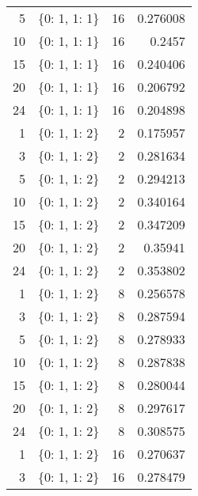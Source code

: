 \documentclass{article}
\begin{document}
\begin{table}[H]
\begin{tabular}{rlrr}
              5 & \{0: 1, 1: 1\}              &          16 &               0.276008  \\
             10 & \{0: 1, 1: 1\}              &          16 &               0.2457    \\
             15 & \{0: 1, 1: 1\}              &          16 &               0.240406  \\
             20 & \{0: 1, 1: 1\}              &          16 &               0.206792  \\
             24 & \{0: 1, 1: 1\}              &          16 &               0.204898  \\
              1 & \{0: 1, 1: 2\}              &           2 &               0.175957  \\
              3 & \{0: 1, 1: 2\}              &           2 &               0.281634  \\
              5 & \{0: 1, 1: 2\}              &           2 &               0.294213  \\
             10 & \{0: 1, 1: 2\}              &           2 &               0.340164  \\
             15 & \{0: 1, 1: 2\}              &           2 &               0.347209  \\
             20 & \{0: 1, 1: 2\}              &           2 &               0.35941   \\
             24 & \{0: 1, 1: 2\}              &           2 &               0.353802  \\
              1 & \{0: 1, 1: 2\}              &           8 &               0.256578  \\
              3 & \{0: 1, 1: 2\}              &           8 &               0.287594  \\
              5 & \{0: 1, 1: 2\}              &           8 &               0.278933  \\
             10 & \{0: 1, 1: 2\}              &           8 &               0.287838  \\
             15 & \{0: 1, 1: 2\}              &           8 &               0.280044  \\
             20 & \{0: 1, 1: 2\}              &           8 &               0.297617  \\
             24 & \{0: 1, 1: 2\}              &           8 &               0.308575  \\
              1 & \{0: 1, 1: 2\}              &          16 &               0.270637  \\
              3 & \{0: 1, 1: 2\}              &          16 &               0.278479  \\

\end{tabular}
\end{table}
\end{document}

